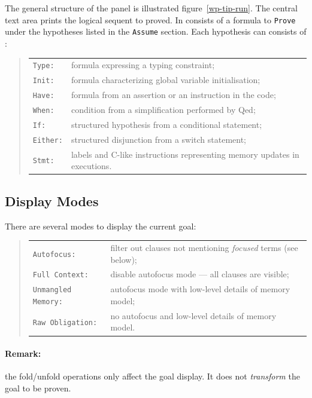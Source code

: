 The general structure of the panel is illustrated figure~\ref{wp-tip-run}. The central text area prints the logical sequent to proved. In consists of a formula to \verb+Prove+ under the hypotheses listed in the \verb+Assume+ section. Each hypothesis can consists of :
\begin{quote}
\begin{tabular}{ll}
\verb+Type:+& formula expressing a typing constraint;\\
\verb+Init:+& formula characterizing global variable initialisation;\\
\verb+Have:+& formula from an assertion or an instruction in the code;\\
\verb+When:+& condition from a simplification performed by \textsf{Qed};\\
\verb+If:+& structured hypothesis from a conditional statement;\\
\verb+Either:+& structured disjunction from a switch statement;\\
\verb+Stmt:+& labels and C-like instructions representing memory updates in executions.\\
\end{tabular}
\end{quote}

\subsection{Display Modes}

There are several modes to display the current goal:
\begin{quote}
\begin{tabular}{ll}
\verb+Autofocus:+ & filter out clauses not mentioning \emph{focused} terms (see below);\\
\verb+Full Context:+ & disable autofocus mode --- all clauses are visible; \\
\verb+Unmangled Memory:+ & autofocus mode with low-level details of memory model; \\
\verb+Raw Obligation:+ & no autofocus and low-level details of memory model.
\end{tabular}
\end{quote}

\paragraph{Remark:} the fold/unfold operations only affect the goal display. It does not \emph{transform} the goal to be proven.

